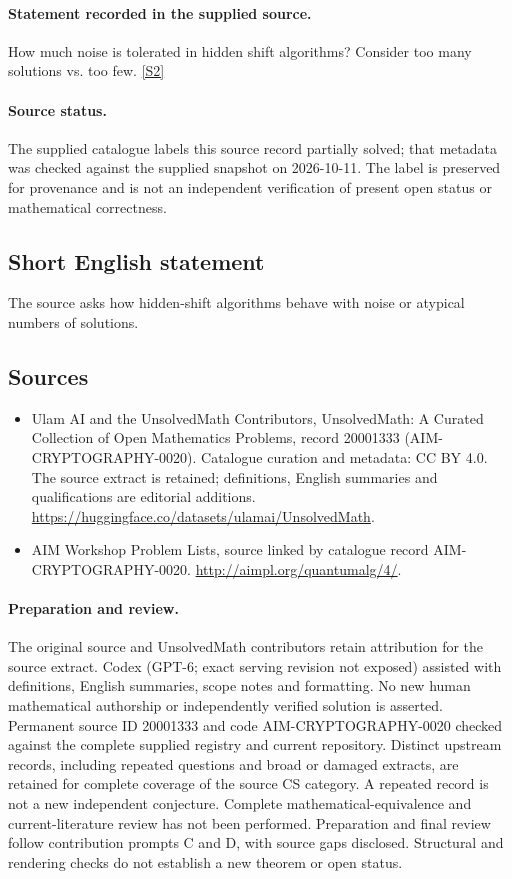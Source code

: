 \documentclass[11pt]{article}
\begin{document}
\paragraph{Statement recorded in the supplied source.}
How much noise is tolerated in hidden shift algorithms? Consider too many solutions vs. too few. \href{http://aimpl.org/quantumalg/4/}{[S2]}
\paragraph{Source status.}
The supplied catalogue labels this source record partially solved; that metadata was checked against the supplied snapshot on 2026-10-11. The label is preserved for provenance and is not an independent verification of present open status or mathematical correctness.
\subsection{Short English statement}
The source asks how hidden-shift algorithms behave with noise or atypical numbers of solutions.
\subsection{Sources}
\begin{itemize}
\item[S1] Ulam AI and the UnsolvedMath Contributors, UnsolvedMath: A Curated Collection of Open Mathematics Problems, record 20001333 (AIM-CRYPTOGRAPHY-0020). Catalogue curation and metadata: CC BY 4.0. The source extract is retained; definitions, English summaries and qualifications are editorial additions.
\url{https://huggingface.co/datasets/ulamai/UnsolvedMath}.
\item[S2] AIM Workshop Problem Lists, source linked by catalogue record AIM-CRYPTOGRAPHY-0020.
\url{http://aimpl.org/quantumalg/4/}.
\end{itemize}
\paragraph{Preparation and review.}
The original source and UnsolvedMath contributors retain attribution for the source extract. Codex (GPT-6; exact serving revision not exposed) assisted with definitions, English summaries, scope notes and formatting. No new human mathematical authorship or independently verified solution is asserted. Permanent source ID 20001333 and code AIM-CRYPTOGRAPHY-0020 checked against the complete supplied registry and current repository. Distinct upstream records, including repeated questions and broad or damaged extracts, are retained for complete coverage of the source CS category. A repeated record is not a new independent conjecture. Complete mathematical-equivalence and current-literature review has not been performed. Preparation and final review follow contribution prompts C and D, with source gaps disclosed. Structural and rendering checks do not establish a new theorem or open status.
\label{end:20001333}
\end{document}
